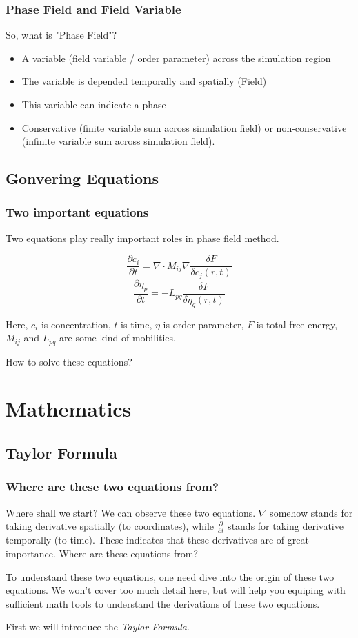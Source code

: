 \documentclass[compress]{beamer}
\begin{document}
\begin{frame}
  \frametitle{Phase Field and Field Variable}
  So, what is "Phase Field"?
  \begin{itemize}
    \item A variable (field variable / order parameter) across the simulation region
    \item The variable is depended temporally and spatially (Field)
    \item This variable can indicate a phase
    \item Conservative (finite variable sum across simulation field) or non-conservative (infinite variable sum across simulation field).
  \end{itemize}
\end{frame}

\subsection{Gonvering Equations}
\begin{frame}
  \frametitle{Two important equations}
  Two equations play really important roles in phase field method.

  \[
    \frac{\partial c_i}{\partial t} = \nabla \cdot M_{ij} \nabla \frac{\delta F}{\delta c_j \left( r,t \right)} \tag{Cahn-Hilliard}
  \]
  \[
    \frac{\partial \eta_p}{\partial t} = -L_{pq}\frac{\delta F}{\delta\eta_q\left( r,t \right)} \tag{Allen-Cahn}
  \]

  Here, \(c_i\) is concentration, \(t\) is time, \(\eta\) is order parameter, \(F\) is total free energy,
  \(M_{ij}\) and \(L_{pq}\) are some kind of mobilities.
  \begin{center}
    {\Huge How to solve these equations?}
  \end{center}
\end{frame}

\section{Mathematics}
\subsection{Taylor Formula}
\begin{frame}
  \frametitle{Where are these two equations from?}
  Where shall we start? We can observe these two equations.
  \bigbreak
  \(\nabla\) somehow stands for taking derivative spatially (to coordinates), while \(\frac{\partial}{\partial t}\)
  stands for taking derivative temporally (to time). These indicates that these derivatives are of great importance.
  \bigbreak
  Where are these equations from?


  To understand these two equations, one need dive into the origin of these two equations. We won't cover too much detail here,
  but will help you equiping with sufficient math tools to understand the derivations of these two equations.

  First we will introduce the \emph{Taylor Formula}.
\end{frame}
\end{document}
